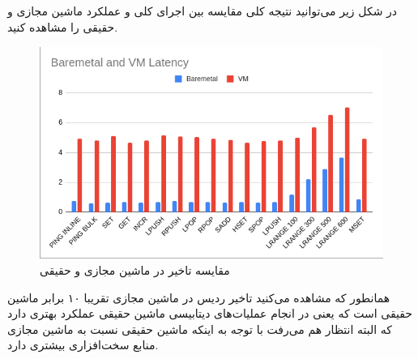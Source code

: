 \subsection{}
در شکل زیر می‌توانید نتیجه کلی مقایسه بین اجرای کلی و عملکرد ماشین مجازی و حقیقی را مشاهده کنید.
\begin{figure}[H]
    \centering
    \includegraphics[scale=0.7]{pictures/redis/overall_results.png}
    \caption{مقایسه تاخیر در ماشین مجازی و حقیقی}
    \label{fig:redis:init:overall_results}
\end{figure}
همانطور که مشاهده می‌کنید تاخیر ردیس در ماشین مجازی تقریبا ۱۰ برابر ماشین حقیقی است که یعنی 
در انجام عملیات‌های دیتابیسی ماشین حقیقی عملکرد بهتری دارد که البته انتظار هم می‌رفت با توجه به اینکه ماشین حقیقی نسبت به ماشین مجازی منابع سخت‌افزاری بیشتری دارد.